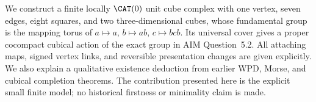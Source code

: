 We construct a finite locally $\CAT(0)$ unit cube complex with one vertex,
seven edges, eight squares, and two three-dimensional cubes, whose fundamental
group is the mapping torus of $a\mapsto a$, $b\mapsto ab$, $c\mapsto bcb$.
Its universal cover gives a proper cocompact cubical action of the exact
group in AIM Question~5.2. All attaching maps, signed vertex links, and
reversible presentation changes are given explicitly. We also explain a
qualitative existence deduction from earlier WPD, Morse, and cubical
completion theorems. The contribution presented here is the explicit small
finite model; no historical firstness or minimality claim is made.
